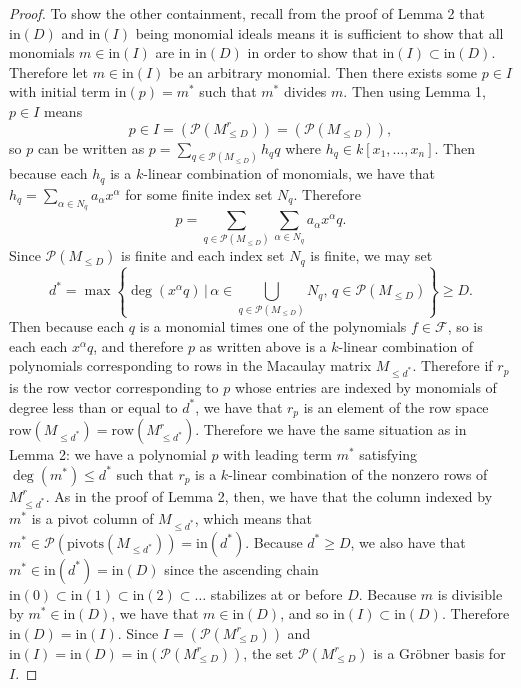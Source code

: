\documentclass[12pt]{article}
\newcommand{\init}{\text{in}}
\newcommand{\Poly}{\mathscr{P}}
\newcommand{\row}{\text{row}}
\newcommand{\piv}{\text{pivots}}
\newcommand{\F}{\mathcal{F}}
\begin{document}
\begin{proof}
	To show the other containment, recall from the proof of Lemma 2 that $\init(D)$ and $\init(I)$ being monomial ideals means it is sufficient to show that all monomials $m \in \init(I)$ are in $\init(D)$ in order to show that $\init(I) \subset \init(D)$. Therefore let $m \in \init(I)$ be an arbitrary monomial. Then there exists some $p \in I$ with initial term $\init(p) = m^*$ such that $m^*$ divides $m$. Then using Lemma 1, $p \in I$ means \[ p \in I = (\Poly(M_{\leq D}^r)) = (\Poly(M_{\leq D})), \] so $p$ can be written as $p = \sum_{q \in \Poly(M_{\leq D})} h_q q$ where $h_q \in k[x_1, \dots, x_n]$. Then because each $h_q$ is a $k$-linear combination of monomials, we have that $h_q = \sum_{\alpha \in N_q} a_\alpha x^\alpha$ for some finite index set $N_q$. Therefore \[ p = \sum_{q \in \Poly(M_{\leq D})} \sum_{\alpha \in N_q} a_\alpha x^\alpha q. \] Since $\Poly(M_{\leq D})$ is finite and each index set $N_q$ is finite, we may set \[ d^* = \max \left\{\deg(x^\alpha q) \, \bigg| \, \alpha \in \bigcup_{q \in \Poly(M_{\leq D})} N_q, \, q \in \Poly(M_{\leq D}) \right\} \geq D. \] Then because each $q$ is a monomial times one of the polynomials $f \in \F$, so is each each $x^\alpha q$, and therefore $p$ as written above is a $k$-linear combination of polynomials corresponding to rows in the Macaulay matrix $M_{\leq d^*}$. Therefore if $r_p$ is the row vector corresponding to $p$ whose entries are indexed by monomials of degree less than or equal to $d^*$, we have that $r_p$ is an element of the row space $\row(M_{\leq d^*}) = \row(M_{\leq d^*}^r)$. Therefore we have the same situation as in Lemma 2: we have a polynomial $p$ with leading term $m^*$ satisfying $\deg(m^*) \leq d^*$ such that $r_p$ is a $k$-linear combination of the nonzero rows of $M_{\leq d^*}^r$. As in the proof of Lemma 2, then, we have that the column indexed by $m^*$ is a pivot column of $M_{\leq d^*}$, which means that $m^* \in \Poly(\piv(M_{\leq d^*})) = \init(d^*)$. Because $d^* \geq D$, we also have that $m^* \in \init(d^*) = \init(D)$ since the ascending chain $\init(0) \subset \init(1) \subset \init(2) \subset \dots$ stabilizes at or before $D$. Because $m$ is divisible by $m^* \in \init(D)$, we have that $m \in \init(D)$, and so $\init(I) \subset \init(D)$. Therefore $\init(D) = \init(I)$. Since $I = (\Poly(M_{\leq D}^r))$ and $\init(I) = \init(D) = \init(\Poly(M_{\leq D}^r))$, the set $\Poly(M_{\leq D}^r)$ is a Gröbner basis for $I$. 
\end{proof}


\newpage


\end{document}
